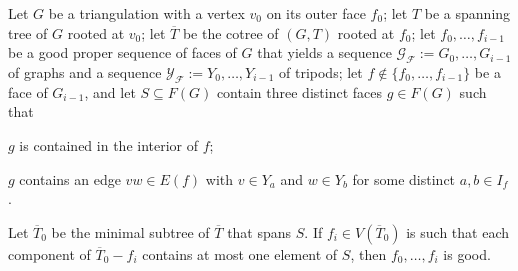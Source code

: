 \documentclass{patmorin}
\begin{document}


\begin{lem}\label{lca_sperner}
  Let $G$ be a triangulation with a vertex $v_0$ on its outer face $f_0$; let $T$ be a spanning tree of $G$ rooted at $v_0$; let $\overline{T}$ be the cotree of $(G,T)$ rooted at $f_0$; let $f_0,\ldots,f_{i-1}$ be a good proper sequence of faces of $G$ that yields a sequence $\mathcal{G}_\mathcal{F}:=G_0,\ldots,G_{i-1}$ of graphs and a sequence $\mathcal{Y}_\mathcal{F}:=Y_0,\ldots,Y_{i-1}$ of tripods; let $f\not\in \{f_0,\ldots,f_{i-1}\}$ be a face of $G_{i-1}$, and let $S\subseteq F(G)$ contain three distinct faces $g\in F(G)$ such that
  \begin{compactenum}[(i)]
      \item $g$ is contained in the interior of $f$;
      \item $g$ contains an edge $vw\in E(f)$ with $v\in Y_a$ and $w\in Y_b$ for some distinct $a,b\in I_f$.
  \end{compactenum}
  Let $\overline{T}_0$ be the minimal subtree of $\overline{T}$ that spans $S$.  If $f_i\in V(\overline{T}_0)$ is such that each component of $\overline{T}_0-f_i$ contains at most one element of $S$, then $f_0,\ldots,f_i$ is good.
\end{lem}
\end{document}
